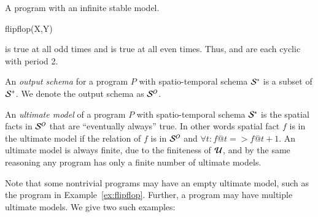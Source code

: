 
\begin{example}
\label{ex:flipflop}
A \lang program with an infinite stable model.

\begin{Drules}
        {flipflop(X,Y)} \\
\end{Drules}

 is true at all odd times and  is true at all even times.  Thus,  and  are each cyclic with period 2.
\end{example}

An {\em output schema} for a \lang program $P$ with spatio-temporal schema $\stschema$ is a subset of $\sschema$.  We denote the output schema as $\oschema$.

An {\em ultimate model} of a \lang program $P$ with spatio-temporal schema $\stschema$ is the spatial facts in $\oschema$ that are ``eventually always'' true.  In other words spatial fact $f$ is in the ultimate model if the relation of $f$ is in $\oschema$ and $\forall t : f@t => f@t+1$. 
An ultimate model is always finite, due to the finiteness of $\univ$, and by the same reasoning any \lang program has only a finite number of ultimate models.

Note that some nontrivial programs may have an empty ultimate model, such as the program in Example~\ref{ex:flipflop}.  Further, a \lang program may have multiple ultimate models.  We give two such examples:

